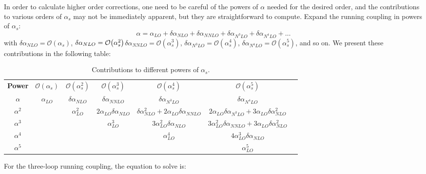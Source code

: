 \documentclass[../main.tex]{subfiles}
\begin{document}
In order to calculate higher order corrections, one need to be careful of the powers of $\alpha$ needed for the desired order, 
and the contributions to various orders of $\alpha_s$ may not be immediately apparent, but they are straightforward to compute.
Expand the running coupling in powers of $\alpha_s$: 
\begin{equation}
    \alpha = \alpha_{LO} + \delta\alpha_{NLO} + \delta\alpha_{NNLO} + \delta\alpha_{N^3LO} + \delta\alpha_{N^4LO} + \ldots
\end{equation} 
with $\delta\alpha_{NLO} = \mathcal{O}(\alpha_s)$, $\delta\alpha_{NLO} = \order{\alpha_s^2}$$\delta\alpha_{NNLO} = \mathcal{O}(\alpha_s^3)$,
 $\delta\alpha_{N^3LO} = \mathcal{O}(\alpha_s^4)$, $\delta\alpha_{N^4LO} = \mathcal{O}(\alpha_s^5)$, and so on.
We present these contributions in the following table:
\begin{table}[htbp] %
    \centering
    \scriptsize
    \begin{tabular}{c c c c c c c}
        
        \textbf{Power} & $\mathcal{O}(\alpha_s)$ & $\mathcal{O}(\alpha_s^2)$ & $\mathcal{O}(\alpha_s^3)$ 
        & $\mathcal{O}(\alpha_s^4)$ & $\mathcal{O}(\alpha_s^5)$\\
     
        $\alpha$ & $\alpha_{LO}$ & $\delta\alpha_{NLO}$ & $\delta\alpha_{NNLO}$ & $\delta\alpha_{N^3LO}$ & $\delta\alpha_{N^4LO}$  \\
        $\alpha^2$ &  & $\alpha_{LO}^2$ & $2\alpha_{LO}\delta\alpha_{NLO}$ & $\delta\alpha_{NLO}^2+2\alpha_{LO}\delta\alpha_{NNLO}$ &
        $2\alpha_{LO}\delta\alpha_{N^3LO}+3\alpha_{LO}\delta\alpha_{NLO}^2$ \\
        $\alpha^3$ &  & & $\alpha_{LO}^3$ & $3\alpha_{LO}^2 \delta\alpha_{NLO}$& $3\alpha_{LO}^2\delta\alpha_{NNLO}+3\alpha_{LO}\delta\alpha_{NLO}^2$  \\
        $\alpha^4$ &  & & & $\alpha_{LO}^4$ & $4 \alpha_{LO}^3 \delta\alpha_{NLO}$  \\
        $\alpha^5$ &  & & & & $\alpha_{LO}^5$ \\
    \end{tabular}
    
    \caption{Contributions to different powers of $\alpha_s$.}
    \label{tab:contributions to different powers of alpha_s}
\end{table}

For the three-loop running coupling, the equation to solve is:
\end{document}
